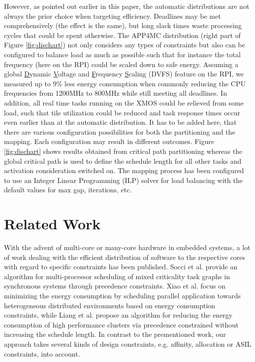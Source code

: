 \documentclass [a4paper,final,conference,10pt]{IDAACS}
\begin{document}
However, as pointed out earlier in this paper, the automatic distributions are not always the prior choice when targeting efficiency. Deadlines may be met comprehensively (the effect is the same), but long slack times waste processing cycles that could be spent otherwise. The APP4MC distribution (right part of Figure \ref{fig:dischart}) not only considers any types of constraints but also can be configured to balance load as much as possible such that for instance the total frequency (here on the RPI) could be scaled down to safe energy. Assuming a global \underline{D}ynamic \underline{V}oltage and \underline{F}requency \underline{S}caling (DVFS) feature on the RPI, we measured up to 9\% less energy consumption when commonly reducing the CPU frequencies from 1200MHz to 800MHz while still meeting all deadlines.  %
In addition, all real time tasks running on the XMOS could be relieved from some load, such that tile utilization could be reduced and task response times occur even earlier than at the automatic distribution. 
It has to be added here, that there are various configuration possibilities for both the partitioning and the mapping. Each configuration may result in different outcomes. Figure \ref{fig:dischart} shows results obtained from critical path partitioning whereas the global critical path is used to define the schedule length for all other tasks and activation consideration switched on. The mapping process has been configured to use an Integer Linear Programming (ILP) solver for load balancing with the default values for max gap, iterations, etc. 
\section{Related Work}
\label{sec:relatedWork}
With the advent of multi-core or many-core hardware in embedded systems, a lot of work dealing with the efficient distribution of software to the respective cores with regard to specific constraints has been published. Socci et al. \cite{Socci2015} provide an algorithm for multi-processor scheduling of mixed criticality task graphs in synchronous systems through precedence constraints. 
Xiao et al. \cite{Xiao2016} focus on minimizing the energy consumption by scheduling parallel application towards heterogeneous distributed environments based on energy consumption constraints, while Liang et al. \cite{LiXi13} propose an algorithm for reducing the energy consumption of high performance clusters via precedence
constrained without increasing the schedule length. In contrast to the prementioned work, our approach takes several kinds of design constraints, e.g. affinity, allocation or ASIL constraints, into account.
\end{document}
